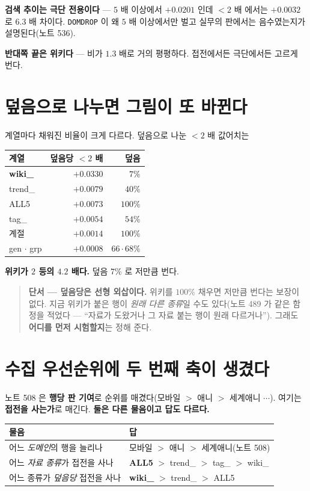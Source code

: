 \documentclass[11pt]{article}
\begin{document}
\textbf{검색 추이는 극단 전용이다} --- $5$ 배 이상에서 $+0.0201$ 인데 $<2$ 배
에서는 $+0.0032$ 로 $6.3$ 배 차이다. \texttt{DOMDROP} 이 왜 $5$ 배 이상에서만
벌고 실무의 판에서는 음수였는지가 설명된다(노트 536).

\textbf{반대쪽 끝은 위키다} --- 비가 $1.3$ 배로 거의 평평하다. 접전에서든
극단에서든 고르게 번다.

\section{덮음으로 나누면 그림이 또 바뀐다}

계열마다 채워진 비율이 크게 다르다. 덮음으로 나눈 $<2$ 배 값어치는

\begin{center}
\begin{tabular}{lrr}
\hline
계열 & 덮음당 $<2$ 배 & 덮음 \\
\hline
\textbf{wiki\_} & $\mathbf{+0.0330}$ & $7\%$ \\
trend\_ & $+0.0079$ & $40\%$ \\
ALL5 & $+0.0073$ & $100\%$ \\
tag\_ & $+0.0054$ & $54\%$ \\
계절 & $+0.0014$ & $100\%$ \\
gen $\cdot$ grp & $+0.0008$ & $66 \cdot 68\%$ \\
\hline
\end{tabular}
\end{center}

\textbf{위키가 $2$ 등의 $4.2$ 배다.} 덮음 $7\%$ 로 저만큼 번다.

\begin{quote}
\textbf{단서 --- 덮음당은 선형 외삽이다.} 위키를 $100\%$ 채우면 저만큼 번다는
보장이 없다. 지금 위키가 붙은 행이 \emph{원래 다른 종류}일 수도 있다(노트 489 가
같은 함정을 적었다 --- ``자료가 도왔거나 그 자료 붙는 행이 원래 다르거나'').
그래도 \textbf{어디를 먼저 시험할지}는 정해 준다.
\end{quote}

\section{수집 우선순위에 두 번째 축이 생겼다}

노트 508 은 \textbf{행당 판 기여}로 순위를 매겼다(모바일 $>$ 애니 $>$ 세계애니
$\cdots$). 여기는 \textbf{접전을 사는가}로 매긴다. \textbf{둘은 다른 물음이고
답도 다르다.}

\begin{center}
\begin{tabular}{ll}
\hline
물음 & 답 \\
\hline
어느 \emph{도메인}의 행을 늘리나 & 모바일 $>$ 애니 $>$ 세계애니(노트 508) \\
어느 \emph{자료 종류}가 접전을 사나 & \textbf{ALL5} $>$ trend\_ $>$ tag\_ $>$ wiki\_ \\
어느 종류가 \emph{덮음당} 접전을 사나 & \textbf{wiki\_} $>$ trend\_ $>$ ALL5 \\
\hline
\end{tabular}
\end{center}
\end{document}
